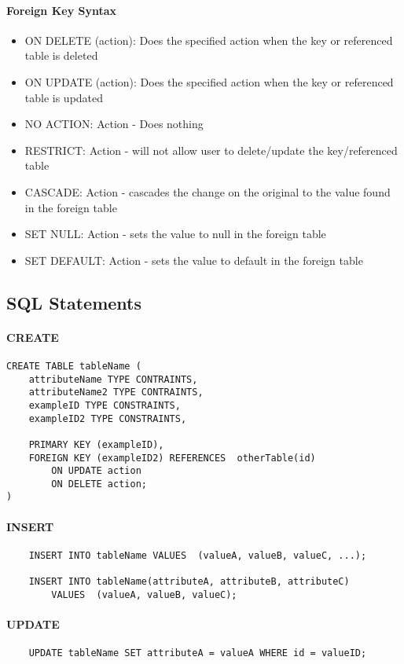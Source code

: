 \paragraph{Foreign Key Syntax}
\begin{itemize}
	\item ON DELETE (action): Does the specified action when the key or referenced table is deleted
	\item ON UPDATE (action): Does the specified action when the key or referenced table is updated
	\item NO ACTION: Action - Does nothing
	\item RESTRICT: Action - will not allow user to delete/update the key/referenced table
	\item CASCADE: Action - cascades the change on the original to the value found in the foreign table
	\item SET NULL: Action - sets the value to null in the foreign table
	\item SET DEFAULT: Action - sets the value to default in the foreign table
\end{itemize}

\subsection{SQL Statements}
\paragraph{CREATE}
\begin{verbatim}
CREATE TABLE tableName (
    attributeName TYPE CONTRAINTS,
    attributeName2 TYPE CONTRAINTS,
    exampleID TYPE CONSTRAINTS,
    exampleID2 TYPE CONSTRAINTS,

    PRIMARY KEY (exampleID),
    FOREIGN KEY (exampleID2) REFERENCES  otherTable(id)
        ON UPDATE action
        ON DELETE action;
)
\end{verbatim}

\paragraph{INSERT}
\begin{verbatim}
    INSERT INTO tableName VALUES  (valueA, valueB, valueC, ...);

    INSERT INTO tableName(attributeA, attributeB, attributeC) 
        VALUES  (valueA, valueB, valueC);
\end{verbatim}

\paragraph{UPDATE}
\begin{verbatim}
    UPDATE tableName SET attributeA = valueA WHERE id = valueID;
\end{verbatim}

